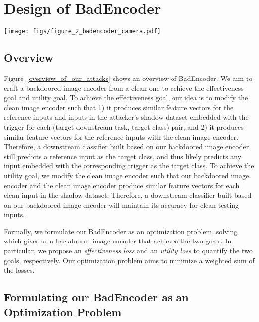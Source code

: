 \section{Design of BadEncoder}
\label{sec:attacks}


\begin{figure*}[!t]
	 \centering
{\texttt{[image: figs/figure\_2\_badencoder\_camera.pdf]}}
\caption{Overview of BadEncoder.}
\label{overview_of_our_attacks}
 \vspace{-6mm}
\end{figure*}

\subsection{Overview}
Figure~\ref{overview_of_our_attacks} shows an overview of BadEncoder. 
We aim to craft a backdoored image encoder from a clean one to achieve the effectiveness goal and utility goal. 
To achieve the effectiveness goal, our idea is to modify the clean image encoder such that 1) it produces similar feature vectors for the reference inputs and inputs in the attacker's shadow dataset embedded with the trigger for each (target downstream task, target class) pair, and 2) it produces similar feature vectors for the reference inputs with the clean image encoder. Therefore, a downstream classifier built based on our backdoored image encoder still predicts a reference input as the target class, and thus likely predicts any input embedded with the corresponding trigger as the target class. To achieve the utility goal, we modify the clean image encoder such that our backdoored image encoder and the clean image encoder produce similar feature vectors for each clean input in the shadow dataset. Therefore, a downstream classifier built based on our backdoored image encoder will maintain its accuracy for clean testing inputs. 

Formally, we formulate our BadEncoder as an optimization problem, solving which gives us a backdoored image encoder that achieves the two goals. In particular, we propose an \emph{effectiveness loss} and an \emph{utility loss} to quantify the two goals, respectively. Our optimization problem aims to minimize a weighted sum of the losses. 








\subsection{Formulating our BadEncoder as an Optimization Problem}

